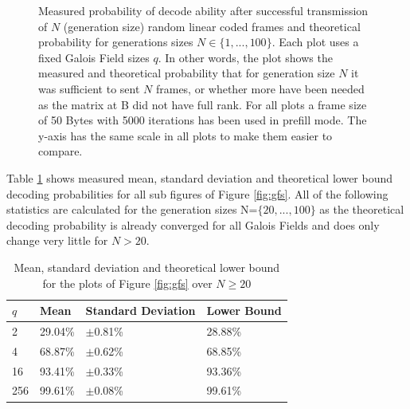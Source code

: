 \documentclass[a4paper,english,10pt]{tumarticle}
\begin{document}
\begin{figure}[htb]
  \hfill
  \caption{Measured probability of decode ability after successful transmission
  of $N$ (generation size) random linear coded frames and theoretical
  probability for generations sizes $N\in\{1, ..., 100\}$. Each plot uses a fixed Galois
  Field sizes $q$. In other words, the plot shows the measured and theoretical
  probability that for generation size $N$ it was sufficient to sent $N$ frames,
  or whether more have been needed as the matrix at B did not have full rank.
  For all plots a frame size of 50 Bytes with 5000 iterations has been used in
  prefill mode. The y-axis has the same scale in all plots to make them easier to
  compare.
  }
\end{figure}\label{fig:gfs}

Table \ref{tab:mean-std} shows measured mean, standard deviation and theoretical
lower bound decoding probabilities for all sub figures of Figure \ref{fig:gfs}.
All of the following statistics are calculated for the generation sizes N=$\{20,
..., 100\}$ as the theoretical decoding probability is already converged for all
Galois Fields and does only change very little for $N>20$. 



\begin{table}[htb]
  \caption{Mean, standard deviation and theoretical lower bound for the plots of Figure \ref{fig:gfs} over $N\ge20$}
  \label{tab:mean-std}
  \centering
  \begin{tabular}{l|l|l|l}
    \toprule
       $q$ & Mean & Standard Deviation & Lower Bound \\
    \midrule
    2 & 29.04\% & $\pm$0.81\% & 28.88\%\\
    4 & 68.87\% & $\pm$0.62\% & 68.85\%\\
    16 & 93.41\% & $\pm$0.33\% & 93.36\%\\
    256 & 99.61\% & $\pm$0.08\% & 99.61\%\\
    \bottomrule
  \end{tabular}
\end{table}
\end{document}
